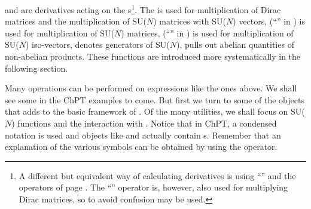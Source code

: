 \enom
{} and  are derivatives acting on the s\footnote{A different but equivalent way of calculating derivatives
is using ``'' and the operators of page \pageref{partialDs}. The ``'' operator is, however, also used for multiplying Dirac matrices, so to avoid confusion  may be used.}.
The \mma {} is used for multiplication of Dirac matrices and the multiplication of SU($N$) matrices with SU($N$) vectors,  (``\mb{$\SixPointedStar$}'' in ) is used for multiplication of SU($N$) matrices,  (``\mb{$\cdot$}'' in ) is used for multiplication of SU($N$) iso-vectors,  denotes generators of SU($N$),  pulls out abelian quantities of non-abelian products. These functions are introduced more systematically in the following section.


Many operations can be performed on expressions like the ones above. We shall see some in the ChPT examples to come. But first we turn to some of the objects that \fphi adds to the basic framework of \fc. Of the many utilities, we shall focus on SU($N$) functions and the interaction with \fa. Notice that in ChPT, a condensed notation is used and objects like  and  actually contain s. Remember that an explanation of the various symbols can be obtained by using the  operator.

